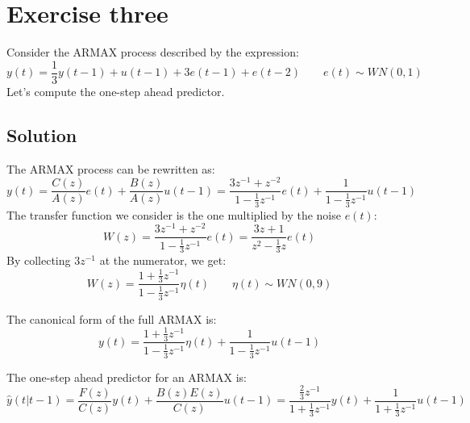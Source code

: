 \section{Exercise three}

Consider the ARMAX process described by the expression:
\[y(t)=\dfrac{1}{3}y(t-1)+u(t-1)+3e(t-1)+e(t-2)\qquad e(t)\sim WN(0,1)\]
Let's compute the one-step ahead predictor.

\subsection*{Solution}
The ARMAX process can be rewritten as:
\[y(t)=\dfrac{C(z)}{A(z)}e(t)+\dfrac{B(z)}{A(z)}u(t-1)=\dfrac{3z^{-1}+z^{-2}}{1-\frac{1}{3}z^{-1}}e(t)+\dfrac{1}{1-\frac{1}{3}z^{-1}}u(t-1)\]
The transfer function we consider is the one multiplied by the noise $e(t)$: 
\[W(z)=\dfrac{3z^{-1}+z^{-2}}{1-\frac{1}{3}z^{-1}}e(t)=\dfrac{3z+1}{z^2-\frac{1}{3}z}e(t)\]
By collecting $3z^{-1}$ at the numerator, we get:
\[W(z)=\dfrac{1+\frac{1}{3}z^{-1}}{1-\frac{1}{3}z^{-1}}\eta(t)\qquad \eta(t)\sim WN(0,9)\]

The canonical form of the full ARMAX is:
\[y(t)=\dfrac{1+\frac{1}{3}z^{-1}}{1-\frac{1}{3}z^{-1}}\eta(t)+\dfrac{1}{1-\frac{1}{3}z^{-1}}u(t-1)\]

The one-step ahead predictor for an ARMAX is:
\[\hat{y}(t|t-1)=\dfrac{F(z)}{C(z)}y(t)+\dfrac{B(z)E(z)}{C(z)}u(t-1)=\dfrac{\frac{2}{3}z^{-1}}{1+\frac{1}{3}z^{-1}}y(t)+\dfrac{1}{1+\frac{1}{3}z^{-1}}u(t-1)\]